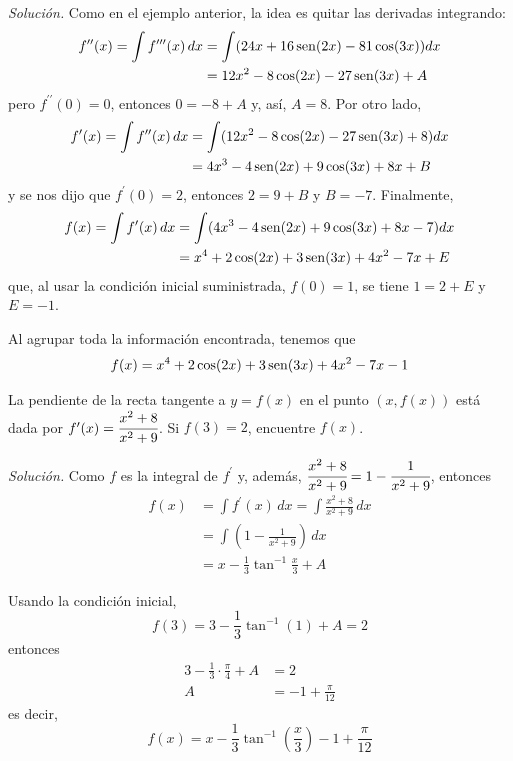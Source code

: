 \begin{ejemplo}
\end{ejemplo}

\emph{Solución.} Como en el ejemplo anterior, la idea es quitar las derivadas integrando:
\begin{align*}
  f^{\prime \prime }(x)=\int f^{\prime \prime\prime }(x)\, dx &=\int (24x+16\operatorname{sen} (2x)-81\cos (3x))dx\\
  &=12x^{2}-8\cos (2x)-27\operatorname{sen} (3x)+A
\end{align*}
pero $f^{\prime \prime }(0)=0$, entonces $0=-8+A$ y, así, $A=8$. Por otro lado,
\begin{align*}
  f^{\prime }(x)=\int f^{\prime \prime }(x)\, dx &= \int (12x^{2}-8\cos (2x)-27\operatorname{sen} (3x)+8)dx \\
  &=4x^{3}-4\operatorname{sen} (2x)+9\cos (3x)+8x+B
\end{align*}
y se nos dijo que $f^\prime (0)=2$, entonces $2=9+B$ y $B=-7$. Finalmente,
\begin{align*}
  f(x)=\int f^\prime(x) \, dx &=\int (4x^{3}-4\operatorname{sen} (2x)+9\cos (3x)+8x-7)dx \\
  &=x^{4}+2\cos (2x)+3\operatorname{sen} (3x)+4x^2-7x+E
\end{align*}
que, al usar la condición inicial suministrada, $f(0)=1$, se tiene $1=2+E$ y $E=-1$.

Al agrupar toda la información encontrada, tenemos que
\[
  f(x)=x^{4}+2\cos (2x)+3\operatorname{sen} (3x)+4x^2-7x-1
\]

\begin{ejemplo}
  La pendiente de la recta tangente a $y=f(x)$ en el punto $(x,f(x))$ está dada por $f^{\prime }(x)=\cfrac{x^{2}+8}{x^{2}+9}$. Si $f(3)=2$, encuentre $f(x)$.
\end{ejemplo}

\emph{Solución.} Como $f$ es la integral de $f^\prime$ y, además, $\cfrac{x^{2}+8}{x^{2}+9}=1-\cfrac{1}{x^{2}+9}$, entonces
\begin{align*}
  f(x)&=\int f^{\prime }(x)\,dx=\int \frac{x^{2}+8}{x^{2}+9}\, dx \\
  &=\int \left( 1-\frac{1}{x^{2}+9}\right)\,dx \\
  &=x-\frac{1}{3}\tan^{-1} \frac{x}{3}+A
\end{align*}

Usando la condición inicial,
\[
  f(3)=3-\frac{1}{3}\tan^{-1}(1)+A=2
\]
entonces
\begin{align*}
  3-\frac{1}{3}\cdot\frac{\pi }{4}+A&=2\\
  A&=-1+\frac{\pi }{12}
\end{align*}
es decir,
\[
  f(x)=x-\frac{1}{3}\tan^{-1}\left(\frac{x}{3}\right)-1+\frac{\pi}{12}
\]


